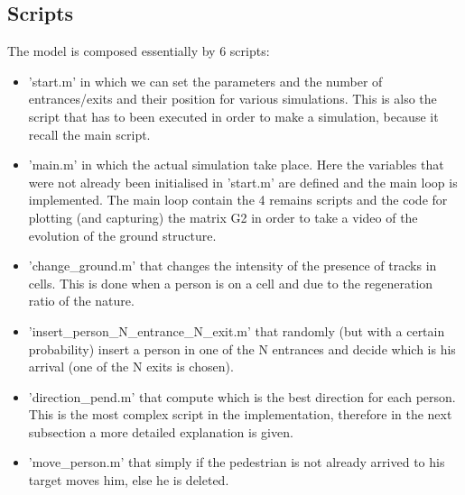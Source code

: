 \documentclass[11pt]{article}
\begin{document}
\subsection{Scripts}
The model is composed essentially by 6 scripts:
\begin{itemize}
\item 'start.m' in which we can set the parameters and the number of entrances/exits and their position for various simulations. This is also the script that has to been executed in order to make a simulation, because it recall the main script. 
\item 'main.m' in which the actual simulation take place. Here the variables that were not already been initialised in 'start.m' are defined and the main loop is implemented. The main loop contain the 4 remains scripts and the code for plotting (and capturing) the matrix G2 in order to take a video of the evolution of the ground structure.
\item 'change\_ground.m' that changes the intensity of the presence of tracks in cells. This is done when a person is on a cell and due to the regeneration ratio of the nature.
\item 'insert\_person\_N\_entrance\_N\_exit.m' that randomly (but with a certain probability) insert a person in one of the N entrances and decide which is his arrival (one of the N exits is chosen).
\item 'direction\_pend.m' that compute which is the best direction for each person. This is the most complex script in the implementation, therefore in the next subsection a more detailed explanation is given.
\item 'move\_person.m' that simply if the pedestrian is not already arrived to his target moves him, else he is deleted.
\end{itemize} 
\end{document}
